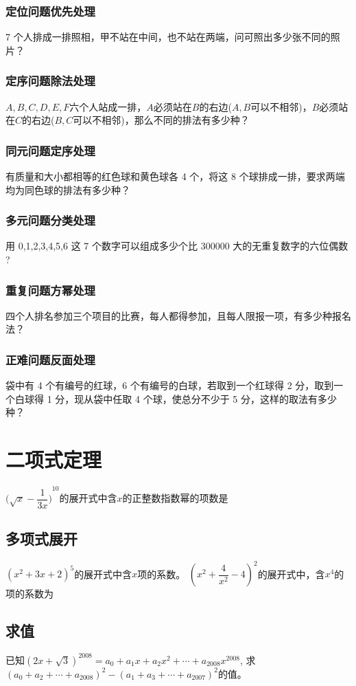 \documentclass{article}
\begin{document}
        \subsubsection{定位问题优先处理}
             7 个人排成一排照相，甲不站在中间，也不站在两端，问可照出多少张不同的照片？
        \subsubsection{定序问题除法处理}
            $A,B,C,D,E,F$六个人站成一排，$A$必须站在$B$的右边($A,B$可以不相邻)，$B$必须站在$C$的右边($B,C$可以不相邻)，那么不同的排法有多少种？%
        \subsubsection{同元问题定序处理}
            有质量和大小都相等的红色球和黄色球各 4 个，将这 8 个球排成一排，要求两端均为同色球的排法有多少种？
        \subsubsection{多元问题分类处理}
            用 0,1,2,3,4,5,6 这 7 个数字可以组成多少个比 300000 大的无重复数字的六位偶数 ?
        \subsubsection{重复问题方幂处理}
            四个人排名参加三个项目的比赛，每人都得参加，且每人限报一项，有多少种报名法？
        \subsubsection{正难问题反面处理}
            袋中有 4 个有编号的红球，6 个有编号的白球，若取到一个红球得 2 分，取到一个白球得 1 分，现从袋中任取 4 个球，使总分不少于 5 分，这样的取法有多少种？





\section{二项式定理}
    \question${\big(\sqrt x-\dfrac{1}{3x}\big)}^{10}$的展开式中含$x$的正整数指数幂的项数是\lines
    \subsection{多项式展开}
        $(x^2+3x+2)^5$的展开式中含$x$项的系数。
        \question $(x^2+\dfrac{4}{x^2}-4)^2$的展开式中，含$x^4$的项的系数为\lines
    \subsection{求值}
        \question[*]已知$(2x+\sqrt3)^{2008}=a_0+a_1x+a_2x^2+\cdots+a_{2008}x^{2008}$, 求$(a_0+a_2+\cdots+a_{2008})^2-(a_1+a_3+\cdots+a_2007)^2$的值。
\end{document}
